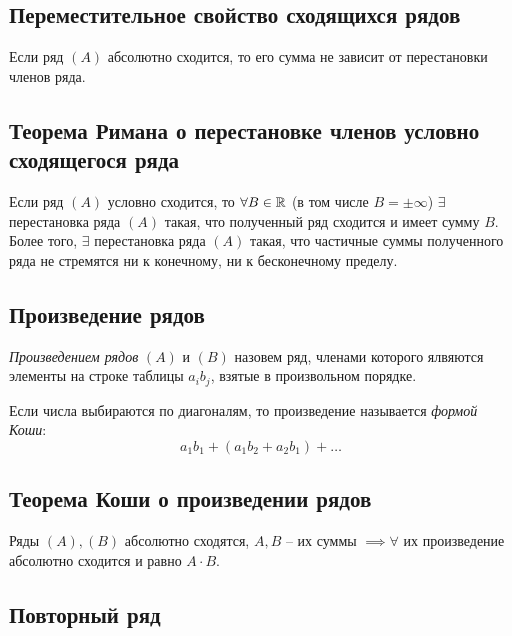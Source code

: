 \subsection{Переместительное свойство сходящихся рядов}

\begin{theorem}
    Если ряд $(A)$ абсолютно сходится, то его сумма не зависит от перестановки членов ряда.
\end{theorem}

\subsection{Теорема Римана о перестановке членов условно сходящегося ряда}

\begin{theorem}
    Если ряд $(A)$ условно сходится, то $\forall B \in \mathbb{R}$ (в том числе $B = \pm\infty$) $\exists$ перестановка ряда $(A)$ такая, что полученный ряд сходится и имеет сумму $B$. Более того, $\exists$ перестановка ряда $(A)$ такая, что частичные суммы полученного ряда не стремятся ни к конечному, ни к бесконечному пределу.
\end{theorem}

\newpage

\subsection{Произведение рядов}

\begin{definition}
    \emph{Произведением рядов} $(A)$ и $(B)$ назовем ряд, членами которого ялвяются элементы на строке таблицы $a_ib_j$, взятые в произвольном порядке.

    Если числа выбираются по диагоналям, то произведение называется \emph{формой Коши}:
    \[
        a_1 b_1 + (a_1 b_2 + a_2 b_1) + \ldots
    \]
\end{definition}

\subsection{Теорема Коши о произведении рядов}

\begin{theorem}
    Ряды $ (A),(B) $ абсолютно сходятся, $A, B$ -- их суммы $\implies \forall$ их произведение абсолютно сходится и равно $A \cdot B$.
\end{theorem}

\subsection{Повторный ряд}

